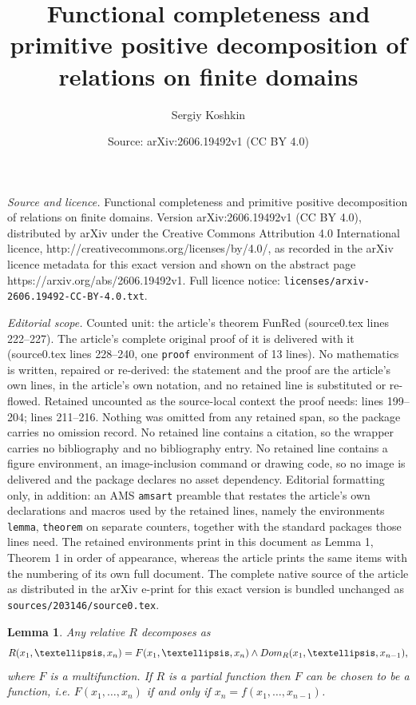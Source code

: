 \documentclass[10pt,a4paper]{amsart}
\title{Functional completeness and primitive positive decomposition of relations on finite domains}
\author{Sergiy Koshkin}
\date{Source: arXiv:2606.19492v1 (CC BY 4.0)}
\newtheorem{lemma}{Lemma}
\begin{document}
\maketitle

\noindent\emph{Source and licence.} Functional completeness and primitive positive decomposition of relations on finite domains. Version arXiv:2606.19492v1 (CC BY 4.0), distributed by arXiv under the Creative Commons Attribution 4.0 International licence, http://creativecommons.org/licenses/by/4.0/, as recorded in the arXiv licence metadata for this exact version and shown on the abstract page https://arxiv.org/abs/2606.19492v1. Full licence notice: \texttt{licenses/arxiv-2606.19492-CC-BY-4.0.txt}.\par\smallskip

\noindent\textit{Editorial scope.} Counted unit: the article's theorem FunRed (source0.tex lines 222--227). The article's complete original proof of it is delivered with it (source0.tex lines 228--240, one \texttt{proof} environment of 13 lines). No mathematics is written, repaired or re-derived: the statement and the proof are the article's own lines, in the article's own notation, and no retained line is substituted or re-flowed.  Retained uncounted as the source-local context the proof needs: lines 199--204; lines 211--216.  Nothing was omitted from any retained span, so the package carries no omission record.  No retained line contains a citation, so the wrapper carries no bibliography and no bibliography entry.  No retained line contains a figure environment, an image-inclusion command or drawing code, so no image is delivered and the package declares no asset dependency.  Editorial formatting only, in addition: an AMS \texttt{amsart} preamble that restates the article's own declarations and macros used by the retained lines, namely the environments \texttt{lemma}, \texttt{theorem} on separate counters, together with the standard packages those lines need.  The retained environments print in this document as Lemma 1, Theorem 1 in order of appearance, whereas the article prints the same items with the numbering of its own full document.  The complete native source of the article as distributed in the arXiv e-print for this exact version is bundled unchanged as \texttt{sources/203146/source0.tex}.
\begin{lemma}\label{DomSplit} Any relative $R$ decomposes as
\begin{equation}\label{Fdom}
R(x_1,\dots,x_n)=F(x_1,\dots,x_n)\land\textup{Dom}_R(x_1,\dots,x_{n-1}),
\end{equation}
where $F$ is a multifunction. If $R$ is a partial function then $F$ can be chosen to be a function, i.e. $F(x_1,\dots,x_n)$ if and only if $x_n=f(x_1,\dots,x_{n-1})$.
\end{lemma}
\end{document}
